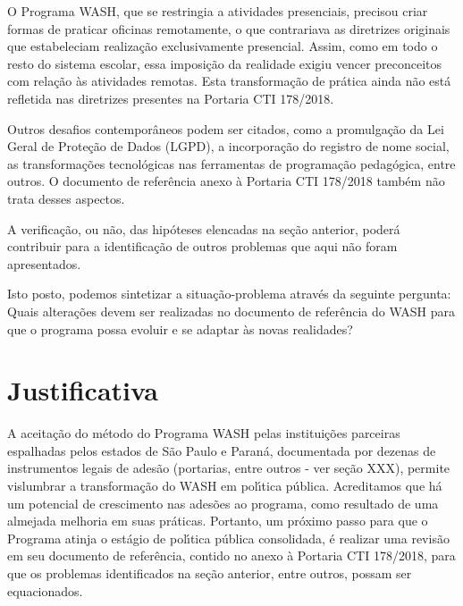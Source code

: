 \documentclass[
12pt,		%
openright,	%
twoside,  %
a4paper,			%
chapter=TITLE,		%
english,			%
french,				%
spanish,			%
brazil				%
]{USPSC-classe/USPSC}
\begin{document}
O Programa WASH, que se restringia a atividades presenciais, precisou criar formas de praticar oficinas remotamente, o que contrariava as diretrizes originais que estabeleciam  realiza\c{c}\~ao exclusivamente presencial. Assim, como em todo o resto do sistema escolar, essa imposi\c{c}\~ao da realidade exigiu vencer preconceitos  com rela\c{c}\~ao \`as atividades remotas. Esta transforma\c{c}\~ao de pr\'atica ainda n\~ao est\'a refletida nas diretrizes presentes na Portaria CTI 178/2018.










Outros desafios contempor\^aneos podem ser citados, como a promulga\c{c}\~ao da Lei Geral de Prote\c{c}\~ao de Dados (LGPD), a incorpora\c{c}\~ao do registro de nome social, as transforma\c{c}\~oes tecnol\'ogicas nas ferramentas de programa\c{c}\~ao pedag\'ogica, entre outros. O documento de refer\^encia anexo \`a Portaria CTI 178/2018 tamb\'em n\~ao trata desses aspectos.










A verifica\c{c}\~ao, ou n\~ao, das hip\'oteses elencadas na se\c{c}\~ao anterior, poder\'a contribuir para a identifica\c{c}\~ao de outros problemas que aqui n\~ao foram apresentados.










Isto posto, podemos sintetizar a situa\c{c}\~ao-problema atrav\'es da seguinte pergunta: \textquotedbl Quais altera\c{c}\~oes devem ser realizadas no documento de refer\^encia do WASH para que o programa possa evoluir e se adaptar \`as novas realidades?\textquotedbl 










\section[Justificativa]{Justificativa}\label{Justificativa}
A aceita\c{c}\~ao do m\'etodo do Programa WASH pelas institui\c{c}\~oes parceiras espalhadas pelos estados de S\~ao Paulo e Paran\'a, documentada por dezenas de instrumentos legais de ades\~ao (portarias, entre outros - ver se\c{c}\~ao XXX), permite vislumbrar a transforma\c{c}\~ao do WASH em pol\'{\i}tica p\'ublica. Acreditamos que h\'a um potencial de crescimento nas ades\~oes ao programa, como resultado de uma almejada melhoria em suas pr\'aticas. Portanto, um pr\'oximo passo para que o Programa atinja o est\'agio de pol\'{\i}tica p\'ublica consolidada, \'e realizar uma revis\~ao em seu documento de refer\^encia, contido no anexo \`a Portaria CTI 178/2018, para que os problemas identificados na se\c{c}\~ao anterior, entre outros, possam ser equacionados.
\end{document}
